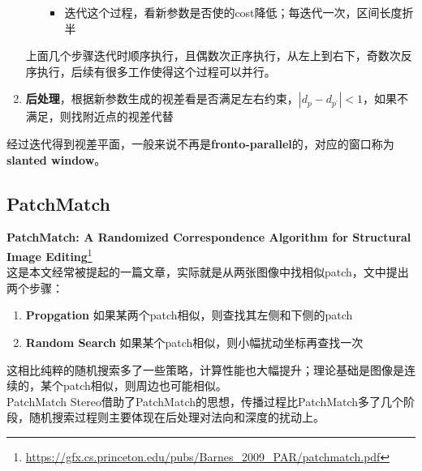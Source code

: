 \begin{enumerate}
\begin{itemize}
\begin{itemize}
						\item 迭代这个过程，看新参数是否使的cost降低；每迭代一次，区间长度折半
					\end{itemize}
			\end{itemize}

			上面几个步骤迭代时顺序执行，且偶数次正序执行，从左上到右下，奇数次反序执行，后续有很多工作使得这个过程可以并行。

		\item \textbf{后处理}，根据新参数生成的视差看是否满足左右约束，$|d_p - d_{p^\prime}| <1$，如果不满足，则找附近点的视差代替

	\end{enumerate}

	经过迭代得到视差平面，一般来说不再是\textbf{fronto-parallel}的，对应的窗口称为\textbf{slanted window}。

\subsection{PatchMatch}

\textbf{PatchMatch: A Randomized Correspondence Algorithm for Structural Image Editing}\protect\footnote{\url{https://gfx.cs.princeton.edu/pubs/Barnes_2009_PAR/patchmatch.pdf}}\\

这是本文经常被提起的一篇文章，实际就是从两张图像中找相似patch，文中提出两个步骤：
\begin{enumerate}
	\item \textbf{Propgation} 如果某两个patch相似，则查找其左侧和下侧的patch
	\item \textbf{Random Search} 如果某个patch相似，则小幅扰动坐标再查找一次
\end{enumerate}

这相比纯粹的随机搜索多了一些策略，计算性能也大幅提升；理论基础是图像是连续的，某个patch相似，则周边也可能相似。\\

PatchMatch Stereo借助了PatchMatch的思想，传播过程比PatchMatch多了几个阶段，随机搜索过程则主要体现在后处理对法向和深度的扰动上。